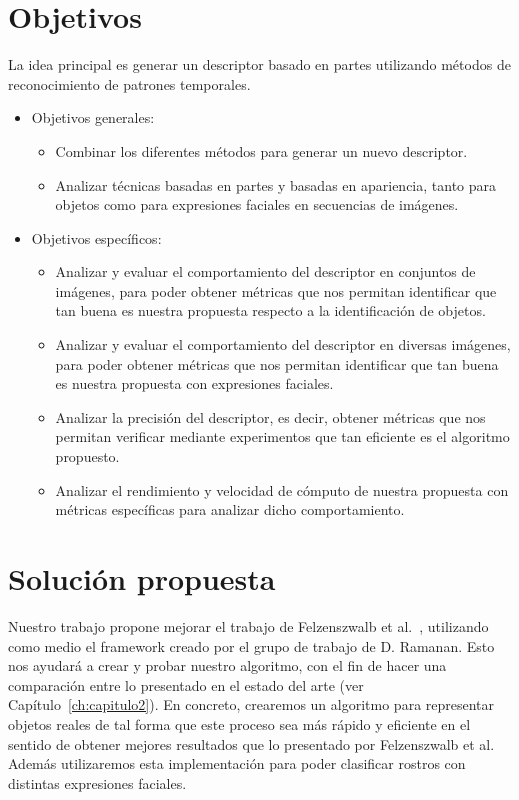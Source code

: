 \section{Objetivos}
La idea principal es generar un descriptor basado en partes utilizando métodos de reconocimiento de patrones temporales.
\begin{itemize}
		\item Objetivos generales:
			\begin{itemize}
				\item Combinar los diferentes métodos para generar un nuevo descriptor.
				\item Analizar técnicas basadas en partes y basadas en apariencia, tanto para objetos como para expresiones faciales en secuencias de imágenes.
			\end{itemize}
		\item Objetivos específicos:
			\begin{itemize}
				\item Analizar y evaluar el comportamiento del descriptor en conjuntos de imágenes, para poder obtener métricas que nos permitan identificar que tan buena es nuestra propuesta respecto a la identificación de objetos.
				\item Analizar y evaluar el comportamiento del descriptor en diversas imágenes, para poder obtener métricas que nos permitan identificar que tan buena es nuestra propuesta con expresiones faciales.
				\item Analizar la precisión del descriptor, es decir, obtener métricas que nos permitan verificar mediante experimentos que tan eficiente es el algoritmo propuesto.
				\item Analizar el rendimiento y velocidad de cómputo de nuestra propuesta con métricas específicas para analizar dicho comportamiento.
				
			\end{itemize}			

	\end{itemize}

\section{Solución propuesta}

Nuestro trabajo propone mejorar el trabajo de Felzenszwalb et al.~\cite{Felzenszwalb2008,Felzenszwalb2010,Felzenszwalb2013}, utilizando como medio el framework creado por el grupo de trabajo de D. Ramanan. Esto nos ayudará a crear y probar nuestro algoritmo, con el fin de hacer una comparación entre lo presentado en el estado del arte (ver Capítulo~\ref{ch:capitulo2}). En concreto, crearemos un algoritmo para representar objetos reales de tal forma que este proceso sea más rápido y eficiente en el sentido de obtener mejores resultados que lo presentado por Felzenszwalb et al. Además utilizaremos esta implementación para poder clasificar rostros con distintas expresiones faciales.

